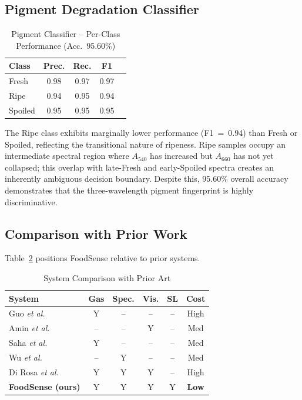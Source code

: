 \documentclass[conference]{IEEEtran}
\begin{document}
\subsection{Pigment Degradation Classifier}

\begin{table}[H]
\centering
\caption{Pigment Classifier -- Per-Class Performance (Acc.\ 95.60\%)}
\label{tab:pigment}
\setlength{\tabcolsep}{4pt}
\begin{tabular}{lcccc}
\toprule
\textbf{Class} & \textbf{Prec.} & \textbf{Rec.} & \textbf{F1} \\
\midrule
Fresh    & 0.98 & 0.97 & 0.97 \\
Ripe     & 0.94 & 0.95 & 0.94 \\
Spoiled  & 0.95 & 0.95 & 0.95 \\
\bottomrule
\end{tabular}
\end{table}

The Ripe class exhibits marginally lower performance (F1~=~0.94) than
Fresh or Spoiled, reflecting the transitional nature of ripeness.
Ripe samples occupy an intermediate spectral region where $A_{540}$ has
increased but $A_{660}$ has not yet collapsed; this overlap with
late-Fresh and early-Spoiled spectra creates an inherently ambiguous
decision boundary. Despite this, 95.60\% overall accuracy demonstrates
that the three-wavelength pigment fingerprint is highly discriminative.

\subsection{Comparison with Prior Work}

Table~\ref{tab:comparison} positions FoodSense relative to prior systems.

\begin{table}[H]
\centering
\caption{System Comparison with Prior Art}
\label{tab:comparison}
\renewcommand{\arraystretch}{1.1}
\setlength{\tabcolsep}{3pt}
\begin{tabular}{lccccc}
\toprule
\textbf{System} & \textbf{Gas} & \textbf{Spec.} & \textbf{Vis.}
  & \textbf{SL} & \textbf{Cost} \\
\midrule
Guo \textit{et al.}~\cite{Guo2020}        & Y & -- & -- & -- & High \\
Amin \textit{et al.}~\cite{Amin2023}       & -- & -- & Y  & -- & Med \\
Saha \textit{et al.}~\cite{Saha2023}       & Y & -- & -- & -- & Med \\
Wu \textit{et al.}~\cite{Wu2023}           & -- & Y  & -- & -- & Med \\
Di Rosa \textit{et al.}~\cite{DiRosa2017}  & Y & Y  & Y  & -- & High \\
\textbf{FoodSense (ours)}                  & Y & Y  & Y  & Y  & \textbf{Low} \\
\bottomrule
\end{tabular}
\end{table}
\end{document}
